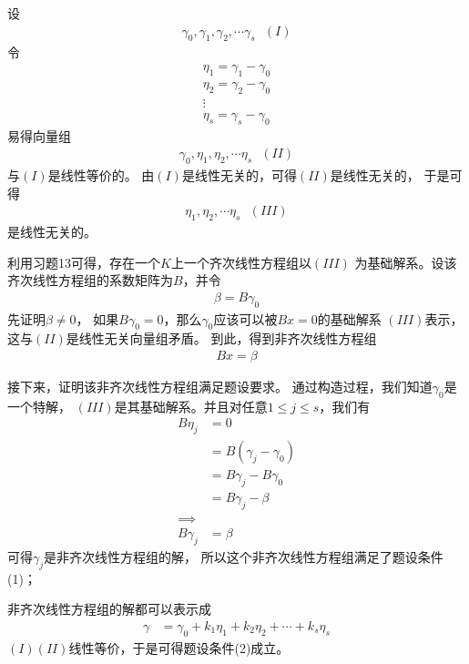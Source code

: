 \documentclass{article}
\begin{document}
设
\begin{align*}
  \gamma_0, \gamma_1, \gamma_2, \cdots \gamma_s \ \ \ (I)
\end{align*}
令
\begin{align*}
  \eta_1 = \gamma_1 - \gamma_0 \\
  \eta_2 = \gamma_2 - \gamma_0 \\
  \vdots                       \\
  \eta_s = \gamma_s - \gamma_0
\end{align*}
易得向量组
\begin{align*}
  \gamma_0, \eta_1, \eta_2, \cdots \eta_s \ \ \ (II)
\end{align*}
与$(I)$是线性等价的。
由$(I)$是线性无关的，可得$(II)$是线性无关的，
于是可得
\begin{align*}
  \eta_1, \eta_2, \cdots \eta_s \ \ \ (III)
\end{align*}
是线性无关的。

利用习题13可得，存在一个$K$上一个齐次线性方程组以$(III)$
为基础解系。设该齐次线性方程组的系数矩阵为$B$，并令
\begin{align*}
  \beta = B \gamma_0
\end{align*}
先证明$\beta \neq 0$，
如果$B \gamma_0 = 0$，那么$\gamma_0$应该可以被$Bx = 0$的基础解系
$(III)$表示，这与$(II)$是线性无关向量组矛盾。
到此，得到非齐次线性方程组
\begin{align*}
  Bx = \beta
\end{align*}

接下来，证明该非齐次线性方程组满足题设要求。
通过构造过程，我们知道$\gamma_0$是一个特解，
$(III)$是其基础解系。并且对任意$1 \leq j \leq s$，我们有
\begin{align*}
  B\eta_j   & = 0                      \\
            & = B(\gamma_j - \gamma_0) \\
            & = B\gamma_j - B\gamma_0  \\
            & = B\gamma_j - \beta      \\
  \implies                             \\
  B\gamma_j & = \beta
\end{align*}
可得$\gamma_j$是非齐次线性方程组的解，
所以这个非齐次线性方程组满足了题设条件(1)；

非齐次线性方程组的解都可以表示成
\begin{align*}
  \gamma & = \gamma_0 + k_1 \eta_1 + k_2 \eta_2 + \cdots + k_s \eta_s
\end{align*}
$(I)(II)$线性等价，于是可得题设条件(2)成立。
\end{document}
